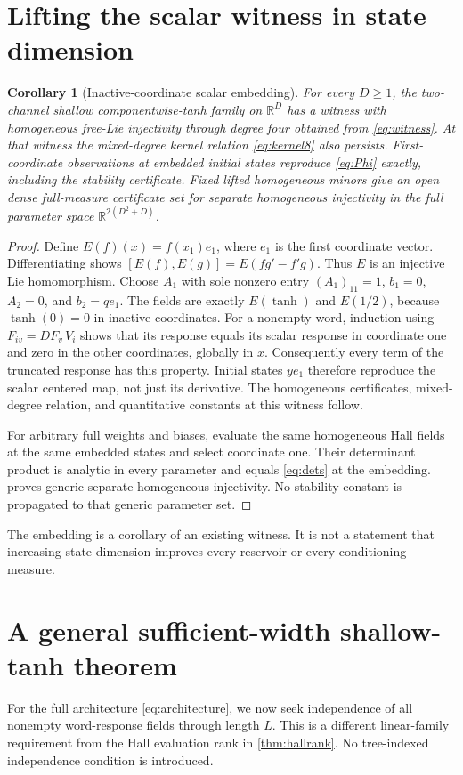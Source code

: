 \documentclass[11pt,a4paper]{article}
\numberwithin{equation}{section}
\newtheorem{corollary}[theorem]{Corollary}
\theoremstyle{definition}
\theoremstyle{remark}
\newcommand{\R}{\mathbb R}
\begin{document}
\section{Lifting the scalar witness in state dimension}
\label{sec:lift}
\begin{corollary}[Inactive-coordinate scalar embedding]\label{cor:lift}
For every $D\geq1$, the two-channel shallow componentwise-tanh family on
$\R^D$ has a witness with homogeneous free-Lie injectivity through degree
four obtained from \eqref{eq:witness}. At that witness the mixed-degree
kernel relation \eqref{eq:kernel8} also persists. First-coordinate
observations at embedded initial states reproduce \eqref{eq:Phi} exactly,
including the stability certificate. Fixed lifted homogeneous minors give
an open dense full-measure certificate set for separate homogeneous
injectivity in the full parameter space $\R^{2(D^2+D)}$.
\end{corollary}
\begin{proof}
Define $E(f)(x)=f(x_1)e_1$, where $e_1$ is the first coordinate vector.
Differentiating shows $[E(f),E(g)]=E(fg'-f'g)$. Thus $E$ is an injective
Lie homomorphism. Choose $A_1$ with sole nonzero entry $(A_1)_{11}=1$,
$b_1=0$, $A_2=0$, and $b_2=qe_1$. The fields are exactly
$E(\tanh)$ and $E(1/2)$, because $\tanh(0)=0$ in inactive coordinates.
For a nonempty word, induction using
$F_{iv}=DF_v\,V_i$ shows that its response equals its scalar response
in coordinate one and zero in the other coordinates, globally in $x$.
Consequently every term of the truncated response has this property.
Initial states $y e_1$ therefore reproduce the scalar centered map, not
just its derivative. The homogeneous certificates, mixed-degree relation,
and quantitative constants at this witness follow.

For arbitrary full weights and biases, evaluate the same homogeneous
Hall fields at the same embedded states and select coordinate one.
Their determinant product is analytic in every parameter and equals
\eqref{eq:dets} at the embedding.  proves generic
separate homogeneous injectivity. No stability constant is propagated
to that generic parameter set.
\end{proof}
The embedding is a corollary of an existing witness. It is not a statement
that increasing state dimension improves every reservoir or every
conditioning measure.

\section{A general sufficient-width shallow-tanh theorem}
\label{sec:width}
For the full architecture \eqref{eq:architecture}, we now seek
independence of all nonempty word-response fields through length $L$.
This is a different linear-family requirement from the Hall evaluation
rank in \cref{thm:hallrank}. No tree-indexed independence condition is
introduced.
\end{document}
